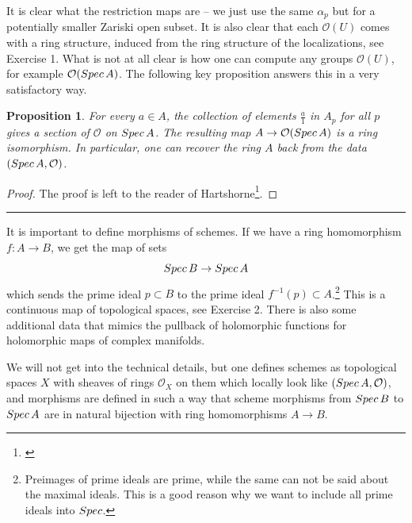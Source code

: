 \documentclass[11pt]{article}
\numberwithin{equation}{section}
\numberwithin{footnote}{section}
\newtheorem{prop}[thm]{Proposition}
\newcommand{\blue}{\color{blue}}
\begin{document}
\smallskip
It is clear what the restriction maps are -- we just use the same $\alpha_p$ but for a potentially smaller Zariski open subset.
It is also clear that each $\mathcal O(U)$ comes with a ring structure,  induced from the ring structure of the localizations,
see Exercise 1.
What is not at all clear is how one can compute any groups $\mathcal O(U)$, for example $\mathcal O({\rm Spec}\,A)$.
The following key proposition answers this in a very satisfactory way.

\smallskip
\begin{prop}
For every $a\in A$, the collection of elements $\frac a1$ in $A_p$ for all $p$ gives a section of $\mathcal O$ on ${\rm Spec}\,A$. 
The resulting map $A\to \mathcal O({\rm Spec}\,A)$ is a ring isomorphism. 
In particular, one can recover the ring $A$ back from the data $({\rm Spec}\,A,\mathcal O)$. 
\end{prop}

\begin{proof}
The proof is left to the reader of Hartshorne\footnote{ \cite[Proposition II.2.2]{Hartshorne}}.
\end{proof}

\smallskip
{\blue \hrule}
It is important to define morphisms of schemes. If we have a ring homomorphism $f:A\to B$, 
we get the map of sets
$$
{\rm Spec}\,B\to {\rm Spec}\,A
$$
which sends the prime ideal $p\subset B$ to the prime ideal $f^{-1}(p)\subset A$.\footnote{ Preimages of prime ideals are prime, while the same can not be said about the maximal ideals. This is a good reason why we want to include all prime ideals into ${\rm Spec}$.}
This is a continuous map of topological spaces, see Exercise 2. There is also some additional data that mimics 
the pullback of holomorphic functions for holomorphic maps of complex manifolds.

\smallskip
We will not get into the technical details, but one defines schemes as topological spaces $X$ with sheaves of rings $\mathcal O_X$ on them which locally look like $({\rm Spec}\,A,\mathcal O)$, and morphisms are defined in such a way that scheme morphisms from ${\rm Spec}\,B$
to ${\rm Spec}\,A$ are in natural bijection with ring homomorphisms $A\to B$.
\end{document}
